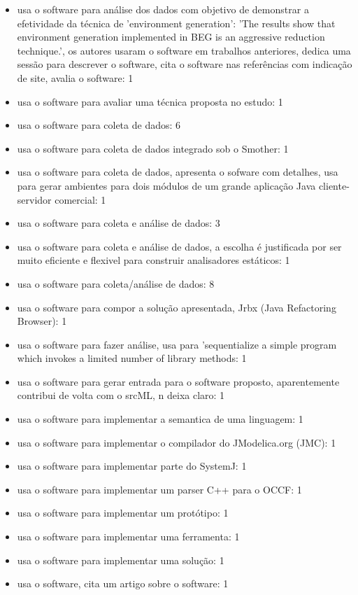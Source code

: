 \begin{itemize}
\item usa o software para análise dos dados com objetivo de demonstrar a efetividade da técnica de 'environment generation': 'The results show that environment generation implemented in BEG is an aggressive reduction technique.', os autores usaram o software em trabalhos anteriores, dedica uma sessão para descrever o software, cita o software nas referências com indicação de site, avalia o software: 1
\item usa o software para avaliar uma técnica proposta no estudo: 1
\item usa o software para coleta de dados: 6
\item usa o software para coleta de dados integrado sob o Smother: 1
\item usa o software para coleta de dados, apresenta o sofware com detalhes, usa para gerar ambientes para dois módulos de um grande aplicação Java cliente-servidor comercial: 1
\item usa o software para coleta e análise de dados: 3
\item usa o software para coleta e análise de dados, a escolha é justificada por ser muito eficiente e flexivel para construir analisadores estáticos: 1
\item usa o software para coleta/análise de dados: 8
\item usa o software para compor a solução apresentada, Jrbx (Java Refactoring Browser): 1
\item usa o software para fazer análise, usa para 'sequentialize a simple program which invokes a limited number of library methods: 1
\item usa o software para gerar entrada para o software proposto, aparentemente contribui de volta com o srcML, n deixa claro: 1
\item usa o software para implementar a semantica de uma linguagem: 1
\item usa o software para implementar o compilador do JModelica.org (JMC): 1
\item usa o software para implementar parte do SystemJ: 1
\item usa o software para implementar um parser C++ para o OCCF: 1
\item usa o software para implementar um protótipo: 1
\item usa o software para implementar uma ferramenta: 1
\item usa o software para implementar uma solução: 1
\item usa o software, cita um artigo sobre o software: 1

\end{itemize}
